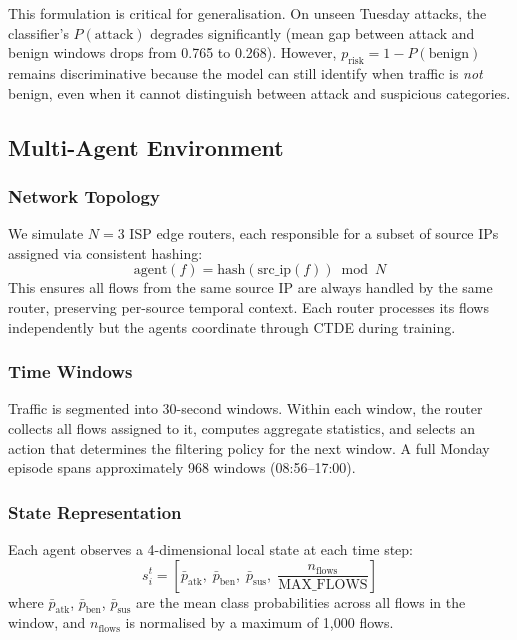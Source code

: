 \documentclass[sigconf,nonacm]{acmart}
\begin{document}
This formulation is critical for generalisation. On unseen Tuesday attacks, the classifier's $P(\text{attack})$ degrades significantly (mean gap between attack and benign windows drops from 0.765 to 0.268). However, $p_\text{risk} = 1 - P(\text{benign})$ remains discriminative because the model can still identify when traffic is \emph{not} benign, even when it cannot distinguish between attack and suspicious categories.

\subsection{Multi-Agent Environment}
\label{sec:env}

\subsubsection{Network Topology}

We simulate $N = 3$ ISP edge routers, each responsible for a subset of source IPs assigned via consistent hashing:
\begin{equation}
    \text{agent}(f) = \text{hash}(\text{src\_ip}(f)) \bmod N
    \label{eq:routing_assign}
\end{equation}
This ensures all flows from the same source IP are always handled by the same router, preserving per-source temporal context. Each router processes its flows independently but the agents coordinate through CTDE during training.

\subsubsection{Time Windows}

Traffic is segmented into 30-second windows. Within each window, the router collects all flows assigned to it, computes aggregate statistics, and selects an action that determines the filtering policy for the next window. A full Monday episode spans approximately 968 windows (08:56--17:00).

\subsubsection{State Representation}

Each agent observes a 4-dimensional local state at each time step:
\begin{equation}
    s_i^t = \left[\bar{p}_\text{atk},\; \bar{p}_\text{ben},\; \bar{p}_\text{sus},\; \frac{n_\text{flows}}{\text{MAX\_FLOWS}}\right]
    \label{eq:state}
\end{equation}
where $\bar{p}_\text{atk}$, $\bar{p}_\text{ben}$, $\bar{p}_\text{sus}$ are the mean class probabilities across all flows in the window, and $n_\text{flows}$ is normalised by a maximum of 1{,}000 flows.
\end{document}
